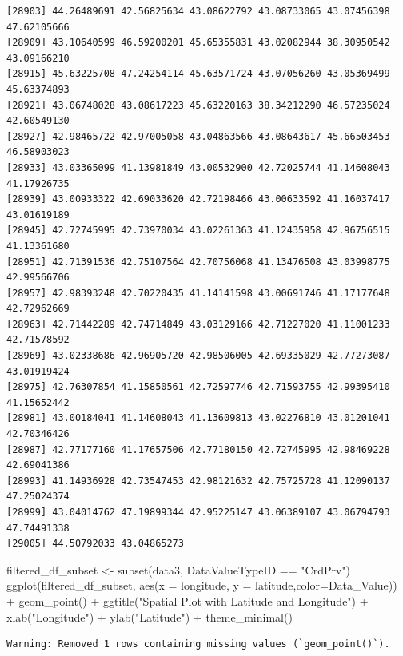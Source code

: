 \documentclass[
  letterpaper,
  DIV=11,
  numbers=noendperiod]{scrartcl}
\newenvironment{Shaded}{\begin{snugshade}}{\end{snugshade}}
\newcommand{\AttributeTok}[1]{\textcolor[rgb]{0.40,0.45,0.13}{#1}}
\newcommand{\FunctionTok}[1]{\textcolor[rgb]{0.28,0.35,0.67}{#1}}
\newcommand{\NormalTok}[1]{\textcolor[rgb]{0.00,0.23,0.31}{#1}}
\newcommand{\OtherTok}[1]{\textcolor[rgb]{0.00,0.23,0.31}{#1}}
\newcommand{\SpecialCharTok}[1]{\textcolor[rgb]{0.37,0.37,0.37}{#1}}
\newcommand{\StringTok}[1]{\textcolor[rgb]{0.13,0.47,0.30}{#1}}
\begin{document}
\begin{verbatim}
[28903] 44.26489691 42.56825634 43.08622792 43.08733065 43.07456398 47.62105666
[28909] 43.10640599 46.59200201 45.65355831 43.02082944 38.30950542 43.09166210
[28915] 45.63225708 47.24254114 45.63571724 43.07056260 43.05369499 45.63374893
[28921] 43.06748028 43.08617223 45.63220163 38.34212290 46.57235024 42.60549130
[28927] 42.98465722 42.97005058 43.04863566 43.08643617 45.66503453 46.58903023
[28933] 43.03365099 41.13981849 43.00532900 42.72025744 41.14608043 41.17926735
[28939] 43.00933322 42.69033620 42.72198466 43.00633592 41.16037417 43.01619189
[28945] 42.72745995 42.73970034 43.02261363 41.12435958 42.96756515 41.13361680
[28951] 42.71391536 42.75107564 42.70756068 41.13476508 43.03998775 42.99566706
[28957] 42.98393248 42.70220435 41.14141598 43.00691746 41.17177648 42.72962669
[28963] 42.71442289 42.74714849 43.03129166 42.71227020 41.11001233 42.71578592
[28969] 43.02338686 42.96905720 42.98506005 42.69335029 42.77273087 43.01919424
[28975] 42.76307854 41.15850561 42.72597746 42.71593755 42.99395410 41.15652442
[28981] 43.00184041 41.14608043 41.13609813 43.02276810 43.01201041 42.70346426
[28987] 42.77177160 41.17657506 42.77180150 42.72745995 42.98469228 42.69041386
[28993] 41.14936928 42.73547453 42.98121632 42.75725728 41.12090137 47.25024374
[28999] 43.04014762 47.19899344 42.95225147 43.06389107 43.06794793 47.74491338
[29005] 44.50792033 43.04865273
\end{verbatim}

\begin{Shaded}
\begin{Highlighting}[]
\NormalTok{filtered\_df\_subset }\OtherTok{\textless{}{-}} \FunctionTok{subset}\NormalTok{(data3, DataValueTypeID }\SpecialCharTok{==} \StringTok{"CrdPrv"}\NormalTok{)}
\FunctionTok{ggplot}\NormalTok{(filtered\_df\_subset, }\FunctionTok{aes}\NormalTok{(}\AttributeTok{x =}\NormalTok{ longitude, }\AttributeTok{y =}\NormalTok{ latitude,}\AttributeTok{color=}\NormalTok{Data\_Value)) }\SpecialCharTok{+}
  \FunctionTok{geom\_point}\NormalTok{() }\SpecialCharTok{+}
  \FunctionTok{ggtitle}\NormalTok{(}\StringTok{"Spatial Plot with Latitude and Longitude"}\NormalTok{) }\SpecialCharTok{+}
  \FunctionTok{xlab}\NormalTok{(}\StringTok{"Longitude"}\NormalTok{) }\SpecialCharTok{+}
  \FunctionTok{ylab}\NormalTok{(}\StringTok{"Latitude"}\NormalTok{) }\SpecialCharTok{+}
  \FunctionTok{theme\_minimal}\NormalTok{()}
\end{Highlighting}
\end{Shaded}

\begin{verbatim}
Warning: Removed 1 rows containing missing values (`geom_point()`).
\end{verbatim}
\end{document}
